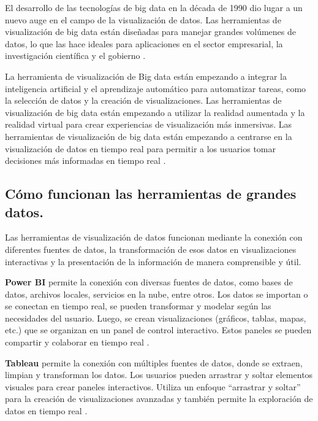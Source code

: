 \documentclass[
  11pt,
  bookmarksnumbered]{article}
\begin{document}
El desarrollo de las tecnologías de big data en la década de 1990 dio lugar a un nuevo auge en el campo de la visualización de datos.
Las herramientas de visualización de big data están diseñadas para manejar grandes volúmenes de datos, lo que las hace ideales para aplicaciones en el sector empresarial, la investigación científica y el gobierno \textcite{olshannikova2016visualizing}.

La herramienta de visualización de Big data están empezando a integrar la inteligencia artificial y el aprendizaje automático para automatizar tareas, como la selección de datos y la creación de visualizaciones.
Las herramientas de visualización de big data están empezando a utilizar la realidad aumentada y la realidad virtual para crear experiencias de visualización más inmersivas.
Las herramientas de visualización de big data están empezando a centrarse en la visualización de datos en tiempo real para permitir a los usuarios tomar decisiones más informadas en tiempo real \textcite{schwabish2021better}.

\hypertarget{cuxf3mo-funcionan-las-herramientas-de-grandes-datos.}{%
\subsection{Cómo funcionan las herramientas de grandes datos.}\label{cuxf3mo-funcionan-las-herramientas-de-grandes-datos.}}

Las herramientas de visualización de datos funcionan mediante la conexión con diferentes fuentes de datos, la transformación de esos datos en visualizaciones interactivas y la presentación de la información de manera comprensible y útil.

\textbf{Power BI} permite la conexión con diversas fuentes de datos, como bases de datos, archivos locales, servicios en la nube, entre otros.
Los datos se importan o se conectan en tiempo real, se pueden transformar y modelar según las necesidades del usuario.
Luego, se crean visualizaciones (gráficos, tablas, mapas, etc.) que se organizan en un panel de control interactivo.
Estos paneles se pueden compartir y colaborar en tiempo real \textcite{microsoft2023powerbi}.

\textbf{Tableau} permite la conexión con múltiples fuentes de datos, donde se extraen, limpian y transforman los datos.
Los usuarios pueden arrastrar y soltar elementos visuales para crear paneles interactivos.
Utiliza un enfoque ``arrastrar y soltar'' para la creación de visualizaciones avanzadas y también permite la exploración de datos en tiempo real \textcite{tableau2023effective}.
\end{document}
